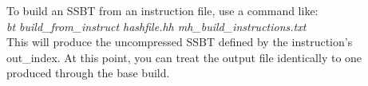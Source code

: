 \documentclass{article}
\begin{document}
To build an SSBT from an instruction file, use a command like: \\

\textit{bt build\_from\_instruct hashfile.hh mh\_build\_instructions.txt} \\

This will produce the uncompressed SSBT defined by the instruction's out\_index. At this point, you can treat the output file identically to one produced through the base build.
\end{document}
